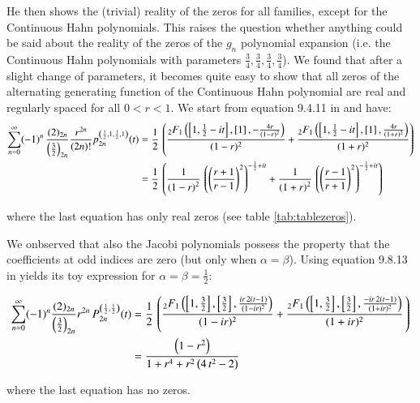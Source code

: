 \documentclass[a4paper,11pt,twoside]{amsart}
\newcommand{\verifiedeq}{=}
\newcommand{\verifiedeq}{\stackrel{\checkmark}{=}}
\begin{document}
\begin{itemize}
\pagebreak
He then shows the (trivial) reality of the zeros for all families, except for the Continuous Hahn polynomials. This raises the question whether anything could be said about the reality of the zeros of the $g_n$ polynomial expansion (i.e. the Continuous Hahn polynomials with parameters $\frac34, \frac34, \frac34, \frac34$). We found that after a slight change of parameters, it becomes quite easy to show that all zeros of the alternating generating function of the Continuous Hahn polynomial are real and regularly spaced for all $0 < r < 1$. We start from equation 9.4.11 in \cite{koe} and have:
\begin{align}
\sum_{n=0}^\infty (-1)^n\, \frac{(2)_{2n}}{\left(\frac32\right)_{2n}}\frac{ r^{2n}}{(2n)!}p_{2n}^{\left(\frac12,1,\frac12,1\right)}(t) &\verifiedeq \frac12\,\left(\frac{{}_2F_1\left(\left[1,\frac12-it\right],\left[1\right], -\frac{4r}{(1-r)^2}\right)}{(1-r)^2}+\frac{{}_2F_1\left(\left[1,\frac12-it\right],\left[1\right], \frac{4r}{(1+r)^2}\right)}{(1+r)^2} \right) \\
 & \verifiedeq \frac12\, \left(\frac{1}{\left(1-r \right)^{2}}\,\left(\left(\dfrac{r+1}{r -1}\right)^{2}\right)^{-\frac{1}{2}+it}+\frac{1}{{\left(1+r \right)^{2}}}\,\left(\left(\dfrac{r -1}{r+1}\right)^{2}\right)^{-\frac{1}{2}+it}\right) \notag
\end{align}

where the last equation has only real zeros (see table \ref{tab:tablezeros}).

We onbserved that also the Jacobi polynomials possess the property that the coefficients at odd indices are zero (but only when $\alpha\verifiedeq \beta$). Using equation 9.8.13 in \cite{koe} yields its toy expression for $\alpha \verifiedeq \beta\verifiedeq \frac12$:

\begin{align}
\sum_{n=0}^\infty (-1)^n \frac{(2)_{2n}}{\left(\frac32\right)_{2n}}r^{2n}\,P_{2n}^{\left(\frac12,\frac12\right)}(t) &\verifiedeq \frac12\,\left(\frac{{}_2F_1\left(\left[1,\frac32\right],\left[\frac32\right],\frac{ir\,2(t-1)}{(1-ir)^2}\right)}{(1-ir)^2}+\frac{{}_2F_1\left(\left[1,\frac32\right],\left[\frac32\right], \frac{-ir\,2(t-1)}{(1+ir)^2}\right)}{(1+ir)^2}\, \right) \\
  & \verifiedeq \frac{\left(1-r^2\right)}{1+r^4+r^2\left(4\,t^2-2\right)} \notag
\end{align}

where the last equation has no zeros.


\end{itemize}
\end{document}
